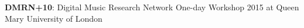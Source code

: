 
\colorbox{qmuldarkblue}
{
 \color{white}
 \parbox{\textwidth}
 {

  \begin{center}

  
\textbf{DMRN+10}: Digital Music Research Network One-day Workshop 2015 at Queen Mary University of London
  
  \end{center}

  \vspace{-1cm}
 }
}
